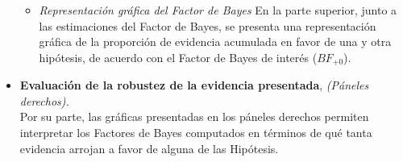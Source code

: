\begin{itemize}
\begin{itemize}
	\item \textit{Representación gráfica del Factor de Bayes} En la parte superior, junto a las estimaciones del Factor de Bayes, se presenta una representación gráfica de la proporción de evidencia acumulada en favor de una y otra hipótesis, de acuerdo con el Factor de Bayes de interés ($BF_{+0}$).
\end{itemize}

\item \textbf{Evaluación de la robustez de la evidencia presentada}, \textit{(Páneles derechos).}\\

Por su parte, las gráficas presentadas en los páneles derechos permiten interpretar los Factores de Bayes computados en términos de qué tanta evidencia arrojan a favor de alguna de las Hipótesis.\\

\end{itemize}

